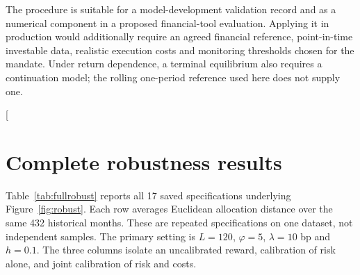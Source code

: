 \documentclass[sigconf,review]{acmart}
\begin{document}
The procedure is suitable for a model-development validation record and as a numerical component in a proposed financial-tool evaluation. Applying it in production would additionally require an agreed financial reference, point-in-time investable data, realistic execution costs and monitoring thresholds chosen for the mandate. Under return dependence, a terminal equilibrium also requires a continuation model; the rolling one-period reference used here does not supply one.



\appendix
\twocolumn[{
\section{Complete robustness results}\label{app:robustness}
Table~\ref{tab:fullrobust} reports all 17 saved specifications underlying Figure~\ref{fig:robust}. Each row averages Euclidean allocation distance over the same 432 historical months. These are repeated specifications on one dataset, not independent samples. The primary setting is $L=120$, $\varphi=5$, $\lambda=10$ bp and $h=0.1$. The three columns isolate an uncalibrated reward, calibration of risk alone, and joint calibration of risk and costs.

}
\end{document}
